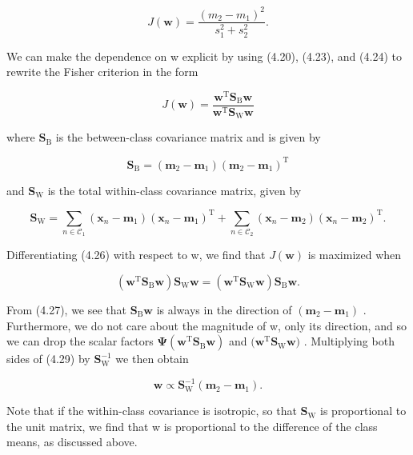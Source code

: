 \documentclass[
  10
]{article}
\begin{document}
\[
J (\mathbf {w}) = \frac {(m _ {2} - m _ {1}) ^ {2}}{s _ {1} ^ {2} + s _ {2} ^ {2}}.\tag{4.25}
\]

We can make the dependence on w explicit by using (4.20), (4.23), and
(4.24) to rewrite the Fisher criterion in the form

\[
J (\mathbf {w}) = \frac {\mathbf {w} ^ {\mathrm{T}} \mathbf {S} _ {\mathrm{B}} \mathbf {w}}{\mathbf {w} ^ {\mathrm{T}} \mathbf {S} _ {\mathrm{W}} \mathbf {w}}\tag{4.26}
\]

where \(\mathbf { S } _ { \mathrm { B } }\) is the between-class
covariance matrix and is given by

\[
\mathbf {S} _ {\mathrm{B}} = (\mathbf {m} _ {2} - \mathbf {m} _ {1}) (\mathbf {m} _ {2} - \mathbf {m} _ {1}) ^ {\mathrm{T}}\tag{4.27}
\]

and \(\mathbf { S } _ { \mathrm { W } }\) is the total within-class
covariance matrix, given by

\[
\mathbf {S} _ {\mathrm{W}} = \sum_ {n \in \mathcal {C} _ {1}} (\mathbf {x} _ {n} - \mathbf {m} _ {1}) (\mathbf {x} _ {n} - \mathbf {m} _ {1}) ^ {\mathrm{T}} + \sum_ {n \in \mathcal {C} _ {2}} (\mathbf {x} _ {n} - \mathbf {m} _ {2}) (\mathbf {x} _ {n} - \mathbf {m} _ {2}) ^ {\mathrm{T}}.\tag{4.28}
\]

Differentiating (4.26) with respect to w, we find that
\(J ( \mathbf { w } )\) is maximized when

\[
(\mathbf {w} ^ {\mathrm{T}} \mathbf {S} _ {\mathrm{B}} \mathbf {w}) \mathbf {S} _ {\mathrm{W}} \mathbf {w} = (\mathbf {w} ^ {\mathrm{T}} \mathbf {S} _ {\mathrm{W}} \mathbf {w}) \mathbf {S} _ {\mathrm{B}} \mathbf {w}.\tag{4.29}
\]

From (4.27), we see that
\(\mathbf { S } _ { \mathrm { B } } \mathbf { w }\) is always in the
direction of
\(\left( \mathbf { m } _ { 2 } - \mathbf { m } _ { 1 } \right)\) .
Furthermore, we do not care about the magnitude of w, only its
direction, and so we can drop the scalar factors
\(\mathbf { \Psi } ( \mathbf { w } ^ { \mathrm { T } } \mathbf { S } _ { \mathrm { B } } \mathbf { w } )\)
and
\(\big ( \mathbf { w } ^ { \mathrm { T } } \mathbf { S } _ { \mathrm { W } } \mathbf { w } \big )\)
. Multiplying both sides of (4.29) by
\(\mathbf { S } _ { \mathrm { W } } ^ { - 1 }\) we then obtain

\[
\mathbf {w} \propto \mathbf {S} _ {\mathrm{W}} ^ {- 1} (\mathbf {m} _ {2} - \mathbf {m} _ {1}).\tag{4.30}
\]

Note that if the within-class covariance is isotropic, so that
\(\mathbf { S } _ { \mathrm { W } }\) is proportional to the unit
matrix, we find that w is proportional to the difference of the class
means, as discussed above.
\end{document}
